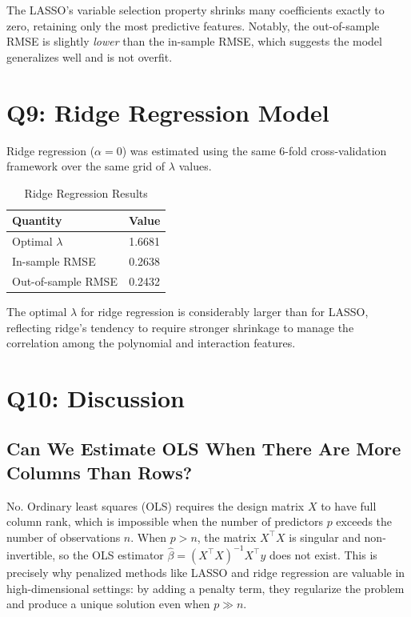 \documentclass[12pt]{article}
\begin{document}
The LASSO's variable selection property shrinks many coefficients exactly to zero, retaining only the most predictive features. Notably, the out-of-sample RMSE is slightly \textit{lower} than the in-sample RMSE, which suggests the model generalizes well and is not overfit.

\section*{Q9: Ridge Regression Model}

Ridge regression ($\alpha = 0$) was estimated using the same 6-fold cross-validation framework over the same grid of $\lambda$ values.

\begin{table}[h]
\centering
\caption{Ridge Regression Results}
\begin{tabular}{lc}
\toprule
\textbf{Quantity} & \textbf{Value} \\
\midrule
Optimal $\lambda$ & 1.6681 \\
In-sample RMSE    & 0.2638 \\
Out-of-sample RMSE & 0.2432 \\
\bottomrule
\end{tabular}
\end{table}

The optimal $\lambda$ for ridge regression is considerably larger than for LASSO, reflecting ridge's tendency to require stronger shrinkage to manage the correlation among the polynomial and interaction features.

\section*{Q10: Discussion}

\subsection*{Can We Estimate OLS When There Are More Columns Than Rows?}

No. Ordinary least squares (OLS) requires the design matrix $X$ to have full column rank, which is impossible when the number of predictors $p$ exceeds the number of observations $n$. When $p > n$, the matrix $X^\top X$ is singular and non-invertible, so the OLS estimator $\hat{\beta} = (X^\top X)^{-1}X^\top y$ does not exist. This is precisely why penalized methods like LASSO and ridge regression are valuable in high-dimensional settings: by adding a penalty term, they regularize the problem and produce a unique solution even when $p \gg n$.
\end{document}
